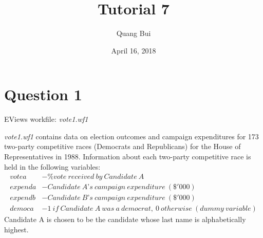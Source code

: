 \documentclass[12pt]{report}
\title{Tutorial 7}
\subtitle
{
	\textbf{keywords}: level log interpretation, dummy variables, hypothesis test, F-test, t-test, p-value, overall significance, individual significance, multiple linear restrictions, reparameterisation
	
	\textbf{estimated reading time}: 35 minutes
}
\author{Quang Bui}
\date{April 16, 2018}
\begin{document}
	
\maketitle

\section*{Question 1}
\noindent EViews workfile: \textit{vote1.wf1}

\noindent \textit{vote1.wf1} contains data on election outcomes and campaign expenditures for 173 two-party competitive races (Democrats and Republicans) for the House of Representatives in 1988. Information about each two-party competitive race is held in the following variables:
\begin{align*}
votea &- \%vote\ received\ by\ Candidate\ A \\
expenda &- Candidate\ A’s\ campaign\ expenditure\ (\$'000) \\
expendb &- Candidate\ B’s\ campaign\ expenditure\ (\$'000) \\
democa &- 1\ if\ Candidate\ A\ was\ a\ democrat,\ 0\ otherwise\ (dummy\ variable)
\end{align*}
\noindent Candidate A is chosen to be the candidate whose last name is alphabetically highest.
\end{document}
